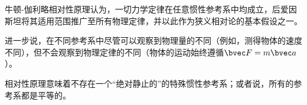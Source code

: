 
\begin{issues}
\issueDraft
\end{issues}


牛顿-伽利略相对性原理认为，一切力学定律在任意惯性参考系中均成立，后爱因斯坦将其适用范围推广至所有物理定律，并以此作为狭义相对论的基本假设之一。

进一步说，在不同参考系中尽管可以观察到物理量的不同（例如，测得物体的速度不同），但不会观察到物理定律的不同（物体的运动始终遵循$\bvec F=m \bvec a$）。

相对性原理意味着不存在一个“绝对静止的”的特殊惯性参考系；或者说，所有的参考系都是平等的。
